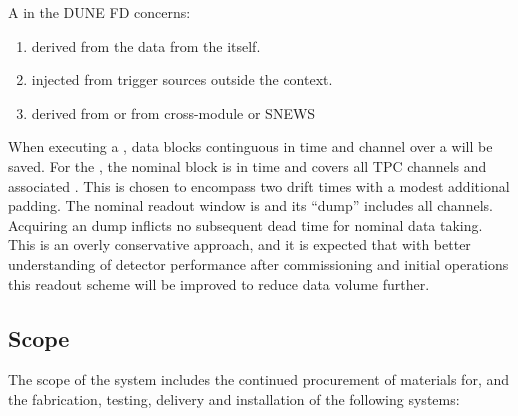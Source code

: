 
A  in the DUNE FD concerns:
\begin{enumerate}
\item {} derived from the data from the  itself.
\item {} injected from trigger sources outside the  context.
\item {}  derived from   or from cross-module or SNEWS 
\end{enumerate}
When executing a , data blocks continguous in time
and channel over a  will be saved. 
For the  , the nominal block is \readout in
time and covers all TPC channels and associated . 
This is chosen to encompass two drift times with a modest additional
padding.
The nominal  readout window is \snbtime and its ``dump''
includes all channels.  
Acquiring an  dump inflicts no subsequent dead time for
nominal data taking.
This is an overly conservative approach, and it is expected that with
better understanding of detector performance after commissioning and
initial operations this readout scheme will be improved to reduce data
volume further.






\subsection{Scope}
\label{sec:fdsp-daq-scope}


The scope of the  system includes the continued procurement
of materials for, and the fabrication, testing, delivery and
installation of the following systems:

